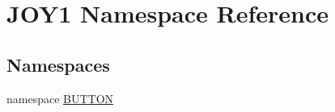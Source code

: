 \hypertarget{namespace_j_o_y1}{
\section{\-J\-O\-Y1 \-Namespace \-Reference}
\label{namespace_j_o_y1}
}
\subsection*{\-Namespaces}
\begin{DoxyCompactItemize}
\item 
namespace \hyperlink{namespace_j_o_y1_1_1_b_u_t_t_o_n}{\-B\-U\-T\-T\-O\-N}
\end{DoxyCompactItemize}
